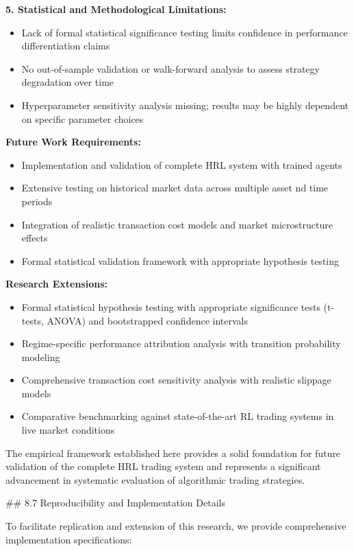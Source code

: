 \documentclass[11pt]{article}
\begin{document}
\textbf{5. Statistical and Methodological Limitations:}
\begin{itemize}
\item Lack of formal statistical significance testing limits confidence in performance differentiation claims
\item No out-of-sample validation or walk-forward analysis to assess strategy degradation over time
\item Hyperparameter sensitivity analysis missing; results may be highly dependent on specific parameter choices

\end{itemize}
\textbf{Future Work Requirements:}
\begin{itemize}
\item Implementation and validation of complete HRL system with trained agents
\item Extensive testing on historical market data across multiple asset nd time periods
\item Integration of realistic transaction cost models and market microstructure effects
\item Formal statistical validation framework with appropriate hypothesis testing

\end{itemize}
\textbf{Research Extensions:}
\begin{itemize}
\item Formal statistical hypothesis testing with appropriate significance tests (t-tests, ANOVA) and bootstrapped confidence intervals
\item Regime-specific performance attribution analysis with transition probability modeling
\item Comprehensive transaction cost sensitivity analysis with realistic slippage models
\item Comparative benchmarking against state-of-the-art RL trading systems in live market conditions

\end{itemize}
The empirical framework established here provides a solid foundation for future validation of the complete HRL trading system and represents a significant advancement in systematic evaluation of algorithmic trading strategies.

\#\# 8.7 Reproducibility and Implementation Details

To facilitate replication and extension of this research, we provide comprehensive implementation specifications:
\end{document}
